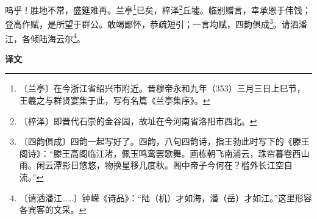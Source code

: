 \documentclass[12pt,UTF-8,openany,a4]{ctexbook}
\begin{document}
\begin{large}
    呜乎！胜地不常，盛筵难再。兰亭\footnote{〔兰亭〕\yiwen 在今浙江省绍兴市附近。晋穆帝永和九年（353）三月三日上巳节，王羲之与群贤宴集于此，写有名篇《兰亭集序》。}已矣，梓泽\footnote{〔梓泽〕\yiwen 即晋代石崇的金谷园，故址在今河南省洛阳市西北。}丘墟。临别赠言，幸承恩于伟饯；登高作赋，是所望于群公。敢竭鄙怀，恭疏短引；一言均赋，四韵俱成\footnote{〔四韵俱成〕\yiwen 四韵一起写好了。四韵，八句四韵诗，指王勃此时写下的《滕王阁诗》：“滕王高阁临江渚，佩玉鸣鸾罢歌舞。画栋朝飞南浦云，珠帘暮卷西山雨。闲云潭影日悠悠，物换星移几度秋。阁中帝子今何在？槛外长江空自流。”}。请洒潘江，各倾陆海云尔\footnote{〔请洒潘江……〕\yiwen 钟嵘《诗品》：“陆（机）才如海，潘（岳）才如江。”这里形容各宾客的文采。}。
\end{large}


\newpage

\begin{Large}
    \noindent\textbf{译文}
\end{Large}


\vspace{1em}
\end{document}
